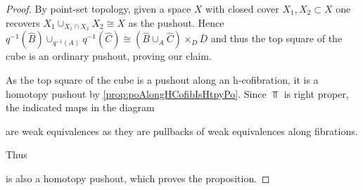 \begin{prop}
\begin{proof}
        By point-set topology, given a space $X$ with closed cover $X_1,X_2\subset X$ one recovers $X_1\cup_{X_1\cap X_2}X_2\cong X$ as the pushout.
        Hence $q^{-1}(\widehat{B})\cup_{q^{-1}(A)}q^{-1}(\widehat{C})\cong\left(\widehat{B}\cup_A\widehat{C}\right)\times_{D}\overline{D}$ and thus the top square of the cube is an ordinary pushout, proving our claim.

        As the top square of the cube is a pushout along an h-cofibration, it is a homotopy pushout by \cref{prop:poAlongHCofibIsHtpyPo}.
        Since $\Top$ is right proper, the indicated maps in the diagram 
        \begin{center}
        \end{center}
        are weak equivalences as they are pullbacks of weak equivalences along fibrations.
        
        Thus
        \begin{center}
        \end{center}
        is also a homotopy pushout, which proves the proposition.
    \end{proof}
\end{prop}

